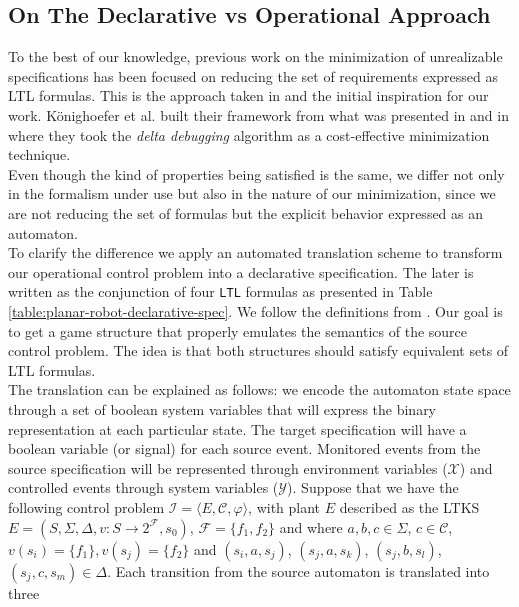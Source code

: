 \subsection{On The Declarative vs Operational Approach}
To the best of our knowledge,
 previous work on the minimization of unrealizable
specifications has been focused on reducing the set of requirements expressed as LTL formulas.  
This is the approach taken in \cite{DBLP:conf/hvc/KonighoferHB10} and the
initial inspiration for our work.  Könighoefer et al. built their framework
from what was presented in \cite{DBLP:conf/vmcai/CimattiRST08} and in
\cite{DBLP:conf/vmcai/2008} where they took the \textit{delta debugging}
algorithm as a cost-effective minimization technique.\\
Even though the kind of properties being satisfied is the same, we differ
not only in the formalism under use but also in the nature of our minimization,
since we are not reducing the set of formulas but the explicit behavior expressed
as an automaton.\\
To clarify the difference we apply an automated translation
scheme to transform our operational control problem  into
a declarative specification.
The later is written as the conjunction of four \texttt{LTL} \cite{pnueli1977temporal}
formulas as presented in Table \ref{table:planar-robot-declarative-spec}. 
We follow the definitions from \cite{DBLP:conf/vmcai/PitermanPS06}. Our goal is to get a game structure that properly emulates the semantics
of the source control problem.  The idea is that both structures should
satisfy equivalent sets of LTL formulas.\\
The translation can be explained as follows:
we encode the automaton state space through a set of boolean system variables
that will express the binary representation at each particular state.  The 
target specification will have a boolean variable (or signal) for each source
event.  Monitored events from the source specification will be 
represented through environment variables ($\mathcal{X}$) and
controlled events through system variables ($\mathcal{Y}$).  
Suppose that we have the following control problem $\mathcal{I}=\langle E, \mathcal{C}, \varphi \rangle$,
with plant $E$ described as the LTKS $E = (S, \Sigma,\Delta, v:S \rightarrow 2^{\mathcal{F}} ,s_0)$, $\mathcal{F}=\{f_1, f_2 \}$ and where
$a,b,c \in \Sigma$, $c \in \mathcal{C}$, $v(s_i)=\{ f_1 \}, v(s_j)=\{f_2\}$ and
$(s_i, a, s_j)$,
$(s_j, a, s_k)$,
$(s_j,b,s_l)$,
$(s_j, c, s_m) \in \Delta$.
Each transition from the source automaton is translated into three 
